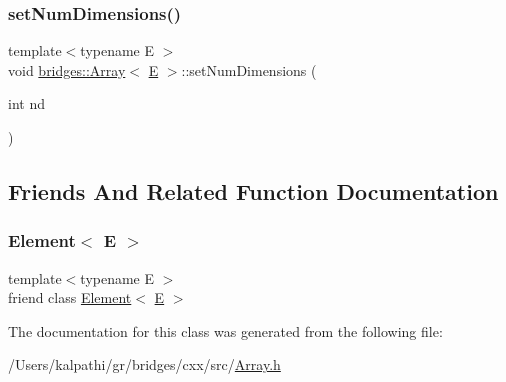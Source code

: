 \subsubsection{\texorpdfstring{setNumDimensions()}{setNumDimensions()}}
{\footnotesize\ttfamily template$<$typename E $>$ \\
void \mbox{\hyperlink{classbridges_1_1_array}{bridges\+::\+Array}}$<$ \mbox{\hyperlink{namespacebridges_acfb0a4f7877d8f63de3e6862004c50eda3a3ea00cfc35332cedf6e5e9a32e94da}{E}} $>$\+::set\+Num\+Dimensions (\begin{DoxyParamCaption}\item[{int}]{nd }\end{DoxyParamCaption})\hspace{0.3cm}{\ttfamily [inline]}}



\subsection{Friends And Related Function Documentation}
\mbox{\label{classbridges_1_1_array_a8c6ff2a8dd3e27346dd25f588a78828a}} 
\subsubsection{\texorpdfstring{Element$<$ E $>$}{Element< E >}}
{\footnotesize\ttfamily template$<$typename E $>$ \\
friend class \mbox{\hyperlink{classbridges_1_1_element}{Element}}$<$ \mbox{\hyperlink{namespacebridges_acfb0a4f7877d8f63de3e6862004c50eda3a3ea00cfc35332cedf6e5e9a32e94da}{E}} $>$\hspace{0.3cm}{\ttfamily [friend]}}



The documentation for this class was generated from the following file\+:\begin{DoxyCompactItemize}
\item 
/\+Users/kalpathi/gr/bridges/cxx/src/\mbox{\hyperlink{_array_8h}{Array.\+h}}\end{DoxyCompactItemize}
